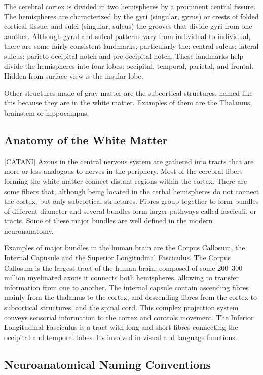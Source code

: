 The cerebral cortex is divided in two hemispheres by a prominent central fissure.
The hemispheres are characterized by the gyri (singular, gyrus) or crests of folded cortical tissue, and sulci (singular, sulcus) the grooves that divide gyri from one another.
Although gyral and sulcal patterns vary from individual to individual, there are some fairly consistent landmarks, particularly the: central sulcus; lateral sulcus; parieto-occipital notch and pre-occipital notch.
These landmarks help divide the hemispheres into four lobes: occipital, temporal, parietal, and frontal.
Hidden from surface view is the insular lobe.

Other structures made of gray matter are the subcortical structures, named like this because they are in the white matter.
Examples of them are the Thalamus, brainstem or hippocampus.

\subsection{Anatomy of the White Matter}
[CATANI]
Axons in the central nervous system are gathered into tracts that are more or less analogous to nerves in the periphery.
Most of the cerebral fibers forming the white matter connect distant regions within the cortex.
There are some fibers that, although being located in the cerbal hemispheres do not connect the cortex, but only subcortical structures.
Fibres group together to form bundles of different diameter and several bundles form larger pathways called fasciculi, or tracts.
Some of these major bundles are well defined in the modern neuronanatomy.

Examples of major bundles in the human brain are the Corpus Callosum, the Internal Capusule and the Superior Longitudinal Fasciculus.
The Corpus Callosum is the largest tract of the human brain, composed of some 200–300 million myelinated axons it connects both hemispheres, allowing to transfer information from one to another.
The internal capsule contain ascending fibres mainly from the thalamus to the cortex, and descending fibres from the cortex to subcortical structures, and the spinal cord.
This complex projection system conveys sensorial information to the cortex and controls movement.
The Inferior Longitudinal Fasciculus is a tract with long and short fibres connecting the occipital and temporal lobes.
Its involved in visual and language functions.


\subsection{Neuroanatomical Naming Conventions}

